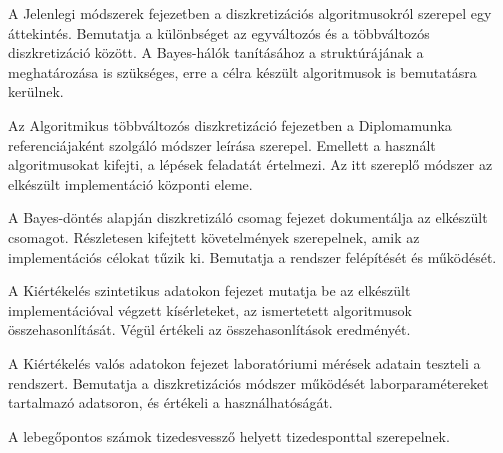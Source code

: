 A Jelenlegi módszerek fejezetben a diszkretizációs algoritmusokról szerepel egy áttekintés. Bemutatja a különbséget az egyváltozós és a többváltozós diszkretizáció között. A Bayes-hálók tanításához a struktúrájának a meghatározása is szükséges, erre a célra készült algoritmusok is bemutatásra kerülnek.

Az Algoritmikus többváltozós diszkretizáció fejezetben a Diplomamunka referenciájaként szolgáló módszer leírása szerepel. Emellett a használt algoritmusokat kifejti, a lépések feladatát értelmezi. Az itt szereplő módszer az elkészült implementáció központi eleme.

A Bayes-döntés alapján diszkretizáló csomag fejezet dokumentálja az elkészült csomagot. Részletesen kifejtett követelmények szerepelnek, amik az implementációs célokat tűzik ki. Bemutatja a rendszer felépítését és működését.

A Kiértékelés szintetikus adatokon fejezet mutatja be az elkészült implementációval végzett kísérleteket, az ismertetett algoritmusok összehasonlítását. Végül értékeli az összehasonlítások eredményét.

A Kiértékelés valós adatokon fejezet laboratóriumi mérések adatain teszteli a rendszert. Bemutatja a diszkretizációs módszer működését laborparamétereket tartalmazó adatsoron, és értékeli a használhatóságát.

A lebegőpontos számok tizedesvessző helyett tizedesponttal szerepelnek.